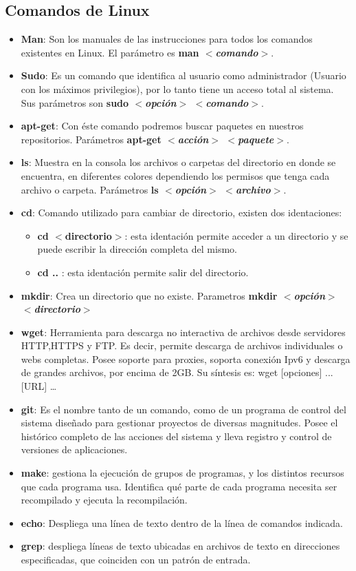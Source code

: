 \documentclass[twocolumn]{IEEEtran}
\begin{document}
 \subsection{Comandos de Linux}
\begin{itemize}
 \item \textbf{Man}: Son los manuales de las instrucciones para todos los comandos existentes en Linux. El parámetro es \textbf{man $<$\textit{comando}$>$}.
 \item \textbf{Sudo}: Es un comando que identifica al usuario como administrador (Usuario con los máximos privilegios), por lo tanto tiene un acceso total al sistema. Sus parámetros son \textbf{sudo $<$\textit{opción}$>$ $<$\textit{comando}$>$}.
 \item \textbf{apt-get}: Con éste comando podremos buscar paquetes en nuestros repositorios. Parámetros \textbf{apt-get $<$\textit{acción}$>$ $<$\textit{paquete}$>$}.
 \item \textbf{ls}: Muestra en la consola los archivos o carpetas del directorio en donde se encuentra, en diferentes colores dependiendo los permisos que tenga cada archivo o carpeta. Parámetros \textbf{ls $<$\textit{opción}$>$ $<$\textit{archivo}$>$}.
 \item \textbf{cd}: Comando utilizado para cambiar de directorio, existen dos identaciones:
\begin{itemize}
 \item \textbf{cd $<$\textbf{directorio}$>$}: esta identación permite acceder a un directorio y se puede escribir la dirección completa del mismo.
 \item \textbf{cd ..} : esta identación permite salir del directorio.
\end{itemize}
 \item \textbf{mkdir}: Crea un directorio que no existe. Parametros \textbf{mkdir $<$\textit{opción}$>$ $<$\textit{directorio}$>$}
 \item \textbf{wget}: Herramienta para descarga no interactiva de archivos desde servidores HTTP,HTTPS y FTP. Es decir, permite descarga de archivos individuales o webs completas. Posee soporte para proxies, soporta conexión Ipv6 y descarga de grandes archivos, por encima de 2GB. Su síntesis es: wget [opciones] ... [URL] …
 \item \textbf{git}: Es el nombre tanto de un comando, como de un programa de control del sistema diseñado para gestionar proyectos de diversas magnitudes. Posee el histórico completo de las acciones del sistema y lleva registro y control de versiones de aplicaciones.
 \item \textbf{make}: gestiona la ejecución de grupos de programas, y los distintos recursos que cada programa usa. Identifica qué parte de cada programa necesita ser recompilado y ejecuta la recompilación.
 \item \textbf{echo}: Despliega una línea de texto dentro de la línea de comandos indicada.
 \item \textbf{grep}: despliega líneas de texto ubicadas en archivos de texto en direcciones especificadas, que coinciden con un patrón de entrada.
\end{itemize}
\end{document}

